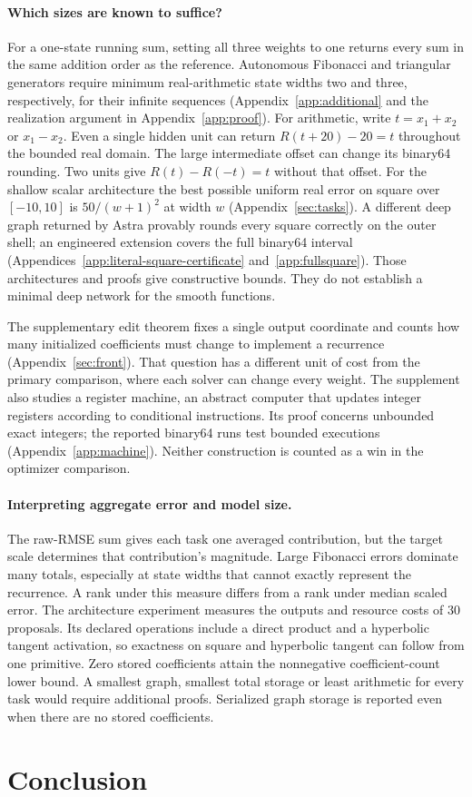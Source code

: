 \paragraph{Which sizes are known to suffice?}
For a one-state running sum, setting all three weights to one returns every sum in the same addition order as the reference. Autonomous Fibonacci and triangular generators require minimum real-arithmetic state widths two and three, respectively, for their infinite sequences (Appendix~\ref{app:additional} and the realization argument in Appendix~\ref{app:proof}). For arithmetic, write $t=x_1+x_2$ or $x_1-x_2$. Even a single hidden unit can return $R(t+20)-20=t$ throughout the bounded real domain. The large intermediate offset can change its binary64 rounding. Two units give $R(t)-R(-t)=t$ without that offset. For the shallow scalar architecture the best possible uniform real error on square over $[-10,10]$ is $50/(w+1)^2$ at width $w$ (Appendix~\ref{sec:tasks}). A different deep graph returned by Astra provably rounds every square correctly on the outer shell; an engineered extension covers the full binary64 interval (Appendices~\ref{app:literal-square-certificate} and~\ref{app:fullsquare}). Those architectures and proofs give constructive bounds. They do not establish a minimal deep network for the smooth functions.

The supplementary edit theorem fixes a single output coordinate and counts how many initialized coefficients must change to implement a recurrence (Appendix~\ref{sec:front}). That question has a different unit of cost from the primary comparison, where each solver can change every weight. The supplement also studies a register machine, an abstract computer that updates integer registers according to conditional instructions. Its proof concerns unbounded exact integers; the reported binary64 runs test bounded executions (Appendix~\ref{app:machine}). Neither construction is counted as a win in the optimizer comparison.

\paragraph{Interpreting aggregate error and model size.}
The raw-RMSE sum gives each task one averaged contribution, but the target scale determines that contribution's magnitude. Large Fibonacci errors dominate many totals, especially at state widths that cannot exactly represent the recurrence. A rank under this measure differs from a rank under median scaled error. The architecture experiment measures the outputs and resource costs of 30 proposals. Its declared operations include a direct product and a hyperbolic tangent activation, so exactness on square and hyperbolic tangent can follow from one primitive. Zero stored coefficients attain the nonnegative coefficient-count lower bound. A smallest graph, smallest total storage or least arithmetic for every task would require additional proofs. Serialized graph storage is reported even when there are no stored coefficients.

\section{Conclusion}

